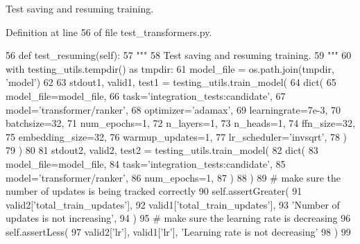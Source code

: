 \begin{DoxyVerb}Test saving and resuming training.
\end{DoxyVerb}
 

Definition at line 56 of file test\+\_\+transformers.\+py.


\begin{DoxyCode}
56     \textcolor{keyword}{def }test\_resuming(self):
57         \textcolor{stringliteral}{"""}
58 \textcolor{stringliteral}{        Test saving and resuming training.}
59 \textcolor{stringliteral}{        """}
60         with testing\_utils.tempdir() \textcolor{keyword}{as} tmpdir:
61             model\_file = os.path.join(tmpdir, \textcolor{stringliteral}{'model'})
62 
63             stdout1, valid1, test1 = testing\_utils.train\_model(
64                 dict(
65                     model\_file=model\_file,
66                     task=\textcolor{stringliteral}{'integration\_tests:candidate'},
67                     model=\textcolor{stringliteral}{'transformer/ranker'},
68                     optimizer=\textcolor{stringliteral}{'adamax'},
69                     learningrate=7e-3,
70                     batchsize=32,
71                     num\_epochs=1,
72                     n\_layers=1,
73                     n\_heads=1,
74                     ffn\_size=32,
75                     embedding\_size=32,
76                     warmup\_updates=1,
77                     lr\_scheduler=\textcolor{stringliteral}{'invsqrt'},
78                 )
79             )
80 
81             stdout2, valid2, test2 = testing\_utils.train\_model(
82                 dict(
83                     model\_file=model\_file,
84                     task=\textcolor{stringliteral}{'integration\_tests:candidate'},
85                     model=\textcolor{stringliteral}{'transformer/ranker'},
86                     num\_epochs=1,
87                 )
88             )
89             \textcolor{comment}{# make sure the number of updates is being tracked correctly}
90             self.assertGreater(
91                 valid2[\textcolor{stringliteral}{'total\_train\_updates'}],
92                 valid1[\textcolor{stringliteral}{'total\_train\_updates'}],
93                 \textcolor{stringliteral}{'Number of updates is not increasing'},
94             )
95             \textcolor{comment}{# make sure the learning rate is decreasing}
96             self.assertLess(
97                 valid2[\textcolor{stringliteral}{'lr'}], valid1[\textcolor{stringliteral}{'lr'}], \textcolor{stringliteral}{'Learning rate is not decreasing'}
98             )
99 
\end{DoxyCode}
\mbox{\label{classtests_1_1test__transformers_1_1TestTransformerRanker_aaaf8b461c4f6460c770c1717c6cf9f5c}} 
